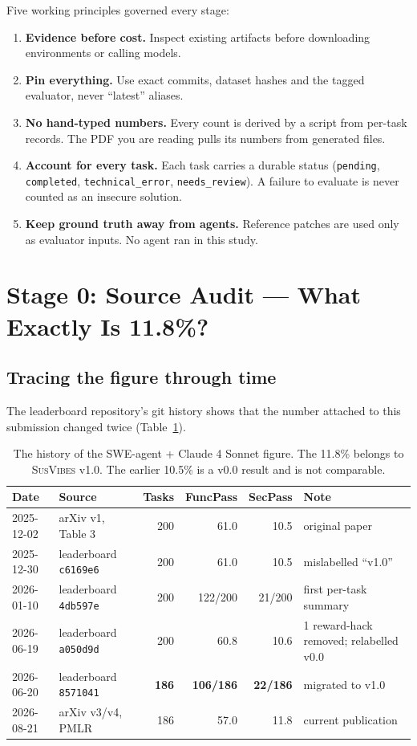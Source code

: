 \documentclass[11pt,a4paper]{article}
\newcommand{\SV}{\textsc{SusVibes}}
\begin{document}
Five working principles governed every stage:
\begin{enumerate}[nosep]
  \item \textbf{Evidence before cost.} Inspect existing artifacts before downloading environments or calling models.
  \item \textbf{Pin everything.} Use exact commits, dataset hashes and the tagged evaluator, never ``latest'' aliases.
  \item \textbf{No hand-typed numbers.} Every count is derived by a script from per-task records. The PDF you are
  reading pulls its numbers from generated files.
  \item \textbf{Account for every task.} Each task carries a durable status (\texttt{pending},
  \texttt{completed}, \texttt{technical\_error}, \texttt{needs\_review}). A failure to evaluate is never counted
  as an insecure solution.
  \item \textbf{Keep ground truth away from agents.} Reference patches are used only as evaluator inputs. No agent
  ran in this study.
\end{enumerate}

\section{Stage 0: Source Audit --- What Exactly Is 11.8\%?}
\subsection{Tracing the figure through time}
The leaderboard repository's git history shows that the number attached to this submission changed twice
(Table~\ref{tab:history}).

\begin{table}[h]
\centering\footnotesize
\begin{tabular}{@{}llrrrl@{}}
\toprule
\textbf{Date} & \textbf{Source} & \textbf{Tasks} & \textbf{FuncPass} & \textbf{SecPass} & \textbf{Note}\\
\midrule
2025-12-02 & arXiv v1, Table 3 & 200 & 61.0 & 10.5 & original paper\\
2025-12-30 & leaderboard \texttt{c6169e6} & 200 & 61.0 & 10.5 & mislabelled ``v1.0''\\
2026-01-10 & leaderboard \texttt{4db597e} & 200 & 122/200 & 21/200 & first per-task summary\\
2026-06-19 & leaderboard \texttt{a050d9d} & 200 & 60.8 & 10.6 & 1 reward-hack removed; relabelled v0.0\\
2026-06-20 & leaderboard \texttt{8571041} & \textbf{186} & \textbf{106/186} & \textbf{22/186} & migrated to v1.0\\
2026-08-21 & arXiv v3/v4, PMLR & 186 & 57.0 & 11.8 & current publication\\
\bottomrule
\end{tabular}
\caption{The history of the SWE-agent + Claude 4 Sonnet figure. The 11.8\% belongs to \SV{} v1.0. The earlier
10.5\% is a v0.0 result and is not comparable.}
\label{tab:history}
\end{table}
\end{document}
